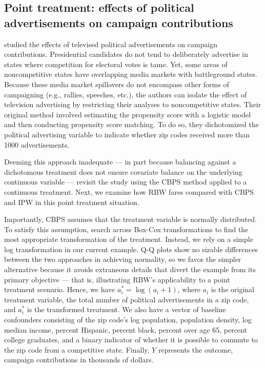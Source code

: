 \hypertarget{point-treatment-example}{%
\subsection{Point treatment: effects of political advertisements on
campaign contributions}\label{point-treatment-example}}

\citet{urbanDollarsSidewalkShould2014a} studied the effects of televised
political advertisements on campaign contributions. Presidential
candidates do not tend to deliberately advertise in states where
competition for electoral votes is tame. Yet, some areas of
noncompetitive states have overlapping media markets with battleground
states. Because these media market spillovers do not encompass other
forms of campaigning (e.g., rallies, speeches, etc.), the authors can
isolate the effect of television advertising by restricting their
analyses to noncompetitive states. Their original method involved
estimating the propensity score with a logistic model and then
conducting propensity score matching. To do so, they dichotomized the
political advertising variable to indicate whether zip codes received
more than 1000 advertisements.

Deeming this approach inadequate --- in part because balancing against a
dichotomous treatment does not ensure covariate balance on the
underlying continuous variable ---
\citet{fongCovariateBalancingPropensity2018} revisit the study using the
CBPS method applied to a continuous treatment. Next, we examine how RBW
fares compared with CBPS and IPW in this point treatment situation.

Importantly, CBPS assumes that the treatment variable is normally
distributed. To satisfy this assumption,
\citet{fongCovariateBalancingPropensity2018} search across Box-Cox
transformations to find the most appropriate transformation of the
treatment. Instead, we rely on a simple log transformation in our
current example. Q-Q plots show no sizable differences between the two
approaches in achieving normality, so we favor the simpler alternative
because it avoids extraneous details that divert the example from its
primary objective --- that is, illustrating RBW's applicability to a
point treatment scenario. Hence, we have \(a_{i}^{*}=\log(a_{i}+1)\),
where \(a_{i}\) is the original treatment variable, the total number of
political advertisements in a zip code, and \(a_{i}^{*}\) is the
transformed treatment. We also have a vector of baseline confounders
consisting of the zip code's log population, population density, log
median income, percent Hispanic, percent black, percent over age 65,
percent college graduates, and a binary indicator of whether it is
possible to commute to the zip code from a competitive state. Finally,
\(Y\) represents the outcome, campaign contributions in thousands of
dollars.

